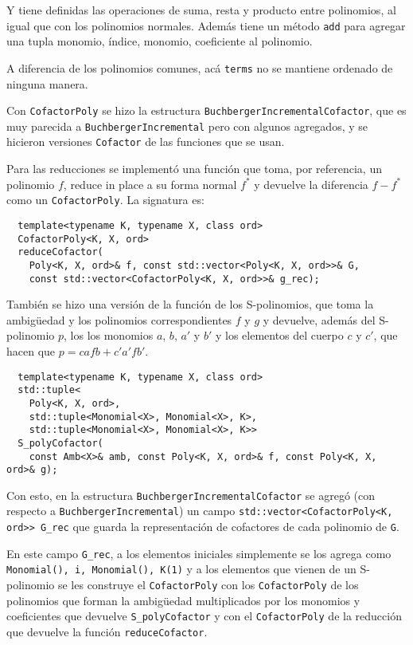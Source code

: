 \documentclass[12pt]{report}
\theoremstyle{customstyle}
\theoremstyle{factstyle}
\begin{document}
Y tiene definidas las operaciones de suma, resta y producto entre polinomios, al igual que con los polinomios normales. Además tiene un método \texttt{add} para agregar una tupla monomio, índice, monomio, coeficiente al polinomio.

A diferencia de los polinomios comunes, acá \texttt{terms} no se mantiene ordenado de ninguna manera.

Con \texttt{CofactorPoly} se hizo la estructura \texttt{BuchbergerIncrementalCofactor}, que es muy parecida a \texttt{BuchbergerIncremental} pero con algunos agregados, y se hicieron versiones \texttt{Cofactor} de las funciones que se usan.

Para las reducciones se implementó una función que toma, por referencia, un polinomio $f$, reduce in place a su forma normal $f^*$ y devuelve la diferencia $f - f^*$ como un \texttt{CofactorPoly}. La signatura es:

\begin{verbatim}
  template<typename K, typename X, class ord>
  CofactorPoly<K, X, ord>
  reduceCofactor(
    Poly<K, X, ord>& f, const std::vector<Poly<K, X, ord>>& G,
    const std::vector<CofactorPoly<K, X, ord>>& g_rec);
\end{verbatim}

También se hizo una versión de la función de los S-polinomios, que toma la ambigüedad y los polinomios correspondientes $f$ y $g$ y devuelve, además del S-polinomio $p$, los los monomios $a$, $b$, $a'$ y $b'$ y los elementos del cuerpo $c$ y $c'$, que hacen que $p = c a f b + c' a' f b'$.

\begin{verbatim}
  template<typename K, typename X, class ord>
  std::tuple<
    Poly<K, X, ord>,
    std::tuple<Monomial<X>, Monomial<X>, K>,
    std::tuple<Monomial<X>, Monomial<X>, K>>
  S_polyCofactor(
    const Amb<X>& amb, const Poly<K, X, ord>& f, const Poly<K, X, ord>& g);
\end{verbatim}

Con esto, en la estructura \texttt{BuchbergerIncrementalCofactor} se agregó (con respecto a \texttt{BuchbergerIncremental}) un campo \texttt{std::vector<CofactorPoly<K, ord>> G\_rec} que guarda la representación de cofactores de cada polinomio de \texttt{G}.

En este campo \texttt{G\_rec}, a los elementos iniciales simplemente se los agrega como \texttt{{Monomial(), i, Monomial(), K(1)}} y a los elementos que vienen de un S-polinomio se les construye el \texttt{CofactorPoly} con los \texttt{CofactorPoly} de los polinomios que forman la ambigüedad multiplicados por los monomios y coeficientes que devuelve \texttt{S\_polyCofactor} y con el \texttt{CofactorPoly} de la reducción que devuelve la función \texttt{reduceCofactor}.
\end{document}
